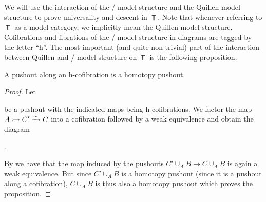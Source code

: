 We will use the interaction of the \Strom/ model structure and the Quillen model structure to prove universality and descent in $\Top$.
Note that whenever referring to $\Top$ as a model category, we implicitly mean the Quillen model structure. 
Cofibrations and fibrations of the \Strom/ model structure in diagrams are tagged by the letter ``h''.
The most important (and quite non-trivial) part of the interaction between Quillen and \Strom/ model structure on $\Top$ is the following proposition.
\begin{prop}\label{prop:poAlongHCofibIsHtpyPo}
    A pushout along an h-cofibration is a homotopy pushout.
    \begin{proof}
        Let
        \begin{center}
        \end{center}
        be a pushout with the indicated maps being h-cofibrations.
        We factor the map $A\xtailrightarrow{} C'\xrightarrow{\sim} C$ into a cofibration followed by a weak equivalence and obtain the diagram
        \begin{center}
            \;.
        \end{center}
        By \cite[Proposition 1.1]{hcolim_bar} we have that the map induced by the pushouts $C'\cup_AB\to C\cup_AB$ is again a weak equivalence.
        But since $C'\cup_AB$ is a homotopy pushout (since it is a pushout along a cofibration), $C\cup_AB$ is thus also a homotopy pushout which proves the proposition.
    \end{proof}
\end{prop}
